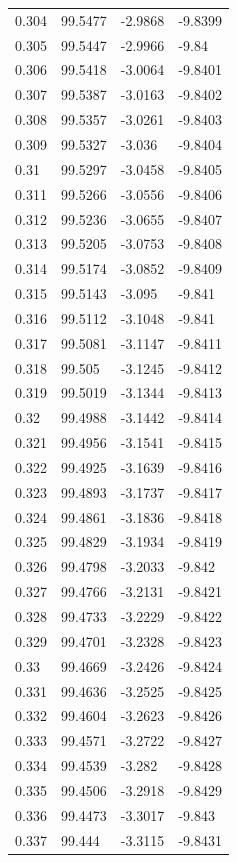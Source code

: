 \begin{tabular}{llll}
0.304 & 99.5477 & -2.9868 & -9.8399 \\
0.305 & 99.5447 & -2.9966 & -9.84 \\
0.306 & 99.5418 & -3.0064 & -9.8401 \\
0.307 & 99.5387 & -3.0163 & -9.8402 \\
0.308 & 99.5357 & -3.0261 & -9.8403 \\
0.309 & 99.5327 & -3.036 & -9.8404 \\
0.31 & 99.5297 & -3.0458 & -9.8405 \\
0.311 & 99.5266 & -3.0556 & -9.8406 \\
0.312 & 99.5236 & -3.0655 & -9.8407 \\
0.313 & 99.5205 & -3.0753 & -9.8408 \\
0.314 & 99.5174 & -3.0852 & -9.8409 \\
0.315 & 99.5143 & -3.095 & -9.841 \\
0.316 & 99.5112 & -3.1048 & -9.841 \\
0.317 & 99.5081 & -3.1147 & -9.8411 \\
0.318 & 99.505 & -3.1245 & -9.8412 \\
0.319 & 99.5019 & -3.1344 & -9.8413 \\
0.32 & 99.4988 & -3.1442 & -9.8414 \\
0.321 & 99.4956 & -3.1541 & -9.8415 \\
0.322 & 99.4925 & -3.1639 & -9.8416 \\
0.323 & 99.4893 & -3.1737 & -9.8417 \\
0.324 & 99.4861 & -3.1836 & -9.8418 \\
0.325 & 99.4829 & -3.1934 & -9.8419 \\
0.326 & 99.4798 & -3.2033 & -9.842 \\
0.327 & 99.4766 & -3.2131 & -9.8421 \\
0.328 & 99.4733 & -3.2229 & -9.8422 \\
0.329 & 99.4701 & -3.2328 & -9.8423 \\
0.33 & 99.4669 & -3.2426 & -9.8424 \\
0.331 & 99.4636 & -3.2525 & -9.8425 \\
0.332 & 99.4604 & -3.2623 & -9.8426 \\
0.333 & 99.4571 & -3.2722 & -9.8427 \\
0.334 & 99.4539 & -3.282 & -9.8428 \\
0.335 & 99.4506 & -3.2918 & -9.8429 \\
0.336 & 99.4473 & -3.3017 & -9.843 \\
0.337 & 99.444 & -3.3115 & -9.8431 \\

\end{tabular}
